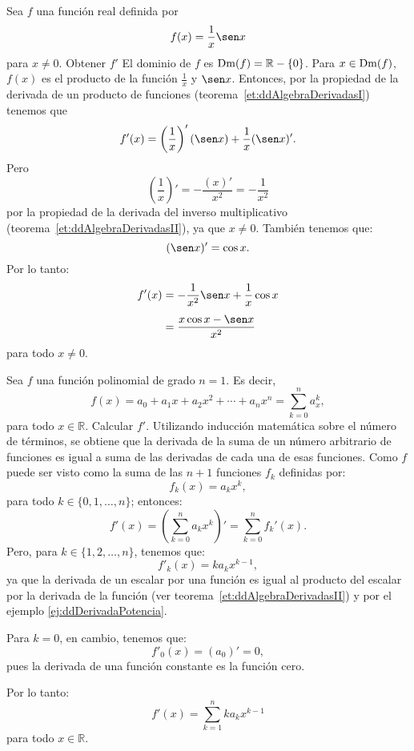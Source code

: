 \begin{exemplo}[Solución]{%
Sea $f$ una función real definida por
\[
f(x) = \frac{1}{x}\sen x
\]
para $x \neq 0$. Obtener $f'$
}%
El dominio de $f$ es $\operatorname{Dm}(f) = \mathbb{R} - \{0\}$. Para $x \in\operatorname{Dm}(f)$, $f(x)$ es el producto de la
función $\frac{1}{x}$ y $\sen x$. Entonces, por la propiedad de la derivada de un producto de
funciones (teorema~\ref{et:ddAlgebraDerivadasI}) tenemos que
\[
f'(x) = \left(\frac{1}{x}\right)'(\sen x) + \frac{1}{x}(\sen x)'.
\]
Pero
\[
\left(\frac{1}{x}\right)' = -\frac{(x)'}{x^2} = -\frac{1}{x^2}
\]
por la propiedad de la derivada del inverso multiplicativo (teorema~\ref{et:ddAlgebraDerivadasII}),
ya que $x\neq 0$. También tenemos que:
\[
(\sen x)' = \cos x.
\]
Por lo tanto:
\begin{align*}
f'(x) &= -\frac{1}{x^2}\sen x + \frac{1}{x}\cos x \\[4pt]
   &= \frac{x\cos x - \sen x}{x^2}
\end{align*}
para todo $x \neq 0$.
\end{exemplo}

\begin{exemplo}[Solución]{%
Sea $f$ una función polinomial de grado $n = 1$. Es decir,
\[
f(x) = a_0 + a_1x + a_2x^2 + \cdots + a_nx^n = \sum_{k=0}^n a_x^k,
\]
para todo $x\in\mathbb{R}$. Calcular $f'$.
}%
Utilizando inducción matemática sobre el número de términos, se obtiene que la derivada de la suma
de un número arbitrario de funciones es igual a suma de las derivadas de cada una de esas
funciones. Como $f$ puede ser visto como la suma de las $n + 1$ funciones $f_k$ definidas por:
\[
f_k(x) = a_kx^k,
\]
para todo $k\in\{0,1,\ldots,n\}$; entonces:
\[
f'(x) = \left(\sum^n_{k=0} a_kx^k\right)' = \sum_{k=0}^n f_k'(x).
\]
Pero, para $k\in\{1,2,\ldots,n\}$, tenemos que:
\[
f'_k(x) = ka_kx^{k-1},
\]
ya que la derivada de un escalar por una función es igual al producto del escalar por la derivada
de la función (ver teorema~\ref{et:ddAlgebraDerivadasII}) y por el ejemplo
\ref{ej:ddDerivadaPotencia}.

Para $k = 0$, en cambio, tenemos que:
\[
f'_0(x) = (a_0)' = 0,
\]
pues la derivada de una función constante es la función cero.

Por lo tanto:
\[
f'(x) = \sum_{k=1}^n ka_kx^{k-1}
\]
para todo $x\in\mathbb{R}$.
\end{exemplo}

